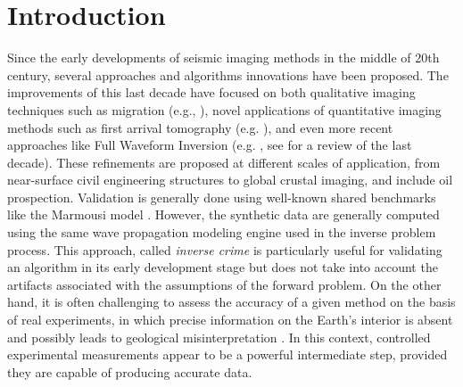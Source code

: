 \documentclass[manuscript,revised]{geophysics}
\begin{document}
\modulolinenumbers[5]
\linenumbers

\section{Introduction}


\noindent Since the early developments of seismic imaging methods in the middle of 20th century, several approaches and algorithms innovations have been proposed. The improvements of this last decade have focused on both qualitative imaging techniques such as migration (e.g., \citet{Berkhout_MSS_2012,Guofeng_GPU_2013}), novel applications of quantitative imaging methods such as first arrival tomography (e.g. \citet{Bohm_CWS_2015}), and even more recent approaches like Full Waveform Inversion (e.g. \citet{Perez_AWI_2014}, see \citet{Virieux_FWI_2009} for a review of the last decade). These refinements are proposed at different scales of application, from near-surface civil engineering structures to global crustal imaging, and include oil prospection. Validation is generally done using well-known shared benchmarks like the Marmousi model \citep{martin2006marmousi2}. However, the synthetic data are generally computed using the same wave propagation modeling engine used in the inverse problem process. This approach, called \textit{inverse crime} \citep{Wirgin_TIC_2004} is particularly useful for validating an algorithm in its early development stage but does not take into account the artifacts associated with the assumptions of the forward problem. On the other hand, it is often challenging to assess the accuracy of a given method on the basis of real experiments, in which precise information on the Earth's interior is absent and possibly leads to geological misinterpretation \citep{Morozov_ARF_2004}. In this context, controlled experimental measurements appear to be a powerful intermediate step, provided they are capable of producing accurate data.
\end{document}
